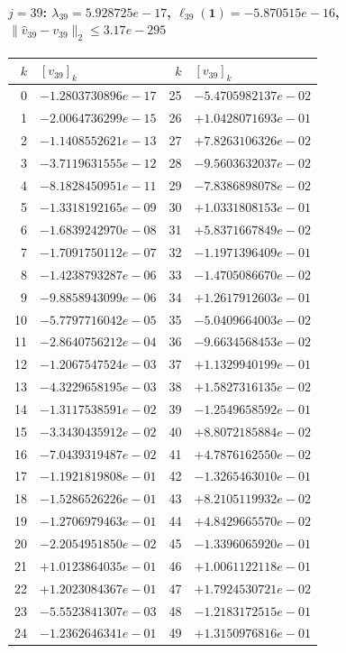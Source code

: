 \paragraph{$j = 39$: $\lambda_{39} = 5.928725e-17$, \quad $\ell_{39}(\mathbf{1}) = -5.870515e-16$, \quad $\|\hat{v}_{39} - v_{39}\|_2 \leq 3.17e-295$}
\begin{center}
{\footnotesize
\begin{tabular}{r@{\;\;}l@{\quad}r@{\;\;}l}
\toprule
$k$ & $[v_{39}]_k$ & $k$ & $[v_{39}]_k$ \\
\midrule
0 & $-1.2803730896e-17$ & 25 & $-5.4705982137e-02$ \\
1 & $-2.0064736299e-15$ & 26 & $+1.0428071693e-01$ \\
2 & $-1.1408552621e-13$ & 27 & $+7.8263106326e-02$ \\
3 & $-3.7119631555e-12$ & 28 & $-9.5603632037e-02$ \\
4 & $-8.1828450951e-11$ & 29 & $-7.8386898078e-02$ \\
5 & $-1.3318192165e-09$ & 30 & $+1.0331808153e-01$ \\
6 & $-1.6839242970e-08$ & 31 & $+5.8371667849e-02$ \\
7 & $-1.7091750112e-07$ & 32 & $-1.1971396409e-01$ \\
8 & $-1.4238793287e-06$ & 33 & $-1.4705086670e-02$ \\
9 & $-9.8858943099e-06$ & 34 & $+1.2617912603e-01$ \\
10 & $-5.7797716042e-05$ & 35 & $-5.0409664003e-02$ \\
11 & $-2.8640756212e-04$ & 36 & $-9.6634568453e-02$ \\
12 & $-1.2067547524e-03$ & 37 & $+1.1329940199e-01$ \\
13 & $-4.3229658195e-03$ & 38 & $+1.5827316135e-02$ \\
14 & $-1.3117538591e-02$ & 39 & $-1.2549658592e-01$ \\
15 & $-3.3430435912e-02$ & 40 & $+8.8072185884e-02$ \\
16 & $-7.0439319487e-02$ & 41 & $+4.7876162550e-02$ \\
17 & $-1.1921819808e-01$ & 42 & $-1.3265463010e-01$ \\
18 & $-1.5286526226e-01$ & 43 & $+8.2105119932e-02$ \\
19 & $-1.2706979463e-01$ & 44 & $+4.8429665570e-02$ \\
20 & $-2.2054951850e-02$ & 45 & $-1.3396065920e-01$ \\
21 & $+1.0123864035e-01$ & 46 & $+1.0061122118e-01$ \\
22 & $+1.2023084367e-01$ & 47 & $+1.7924530721e-02$ \\
23 & $-5.5523841307e-03$ & 48 & $-1.2183172515e-01$ \\
24 & $-1.2362646341e-01$ & 49 & $+1.3150976816e-01$ \\
\bottomrule
\end{tabular}
}
\end{center}

